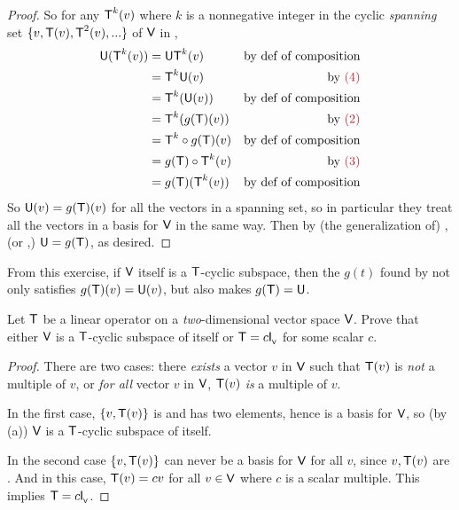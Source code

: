 \begin{proof}
So for any \(\textsf{T}^k(v)\) where \(k\) is a nonnegative integer in the cyclic \emph{spanning} set \(\{ v, \textsf{T}(v), \textsf{T}^2(v), ... \}\) of \(\textsf{V}\) in ,
\begin{align*}
    \U(\T^k(v))
    & = \U \T^k (v) & \text{by def of composition} \\
    & = \T^k \U (v) & \text{by \MAROON{(4)}} \\
    & = \T^k(\U(v)) & \text{by def of composition} \\
    & = \T^k(g(\T)(v)) & \text{by \MAROON{(2)}} \\
    & = \T^k \circ g(\T) (v) & \text{by def of composition} \\
    & = g(\T) \circ \T^k (v) & \text{by \MAROON{(3)}} \\
    & = g(\T) (\T^k(v)) & \text{by def of composition}
\end{align*}
So \(\textsf{U}(v) = g(\textsf{T})(v)\) for all the vectors in a spanning set, so in particular they treat all the vectors in a basis for \(\textsf{V}\) in the same way.
Then by (the generalization of) , (or ,) \(\textsf{U} = g(\textsf{T})\), as desired.
\end{proof}

\begin{note}
From this exercise, if \(\textsf{V}\) itself is a \(\textsf{T}\)-cyclic subspace, then the \(g(t)\) found by  not only satisfies \(g(\textsf{T})(v) = \textsf{U}(v)\), but also makes \(g(\textsf{T}) = \textsf{U}\).
\end{note}

\begin{exercise} \label{exercise 5.4.21}
Let \(\textsf{T}\) be a linear operator on a \emph{two}-dimensional vector space \(\textsf{V}\).
Prove that either \(\textsf{V}\) is a \(\textsf{T}\)-cyclic subspace of itself or \(\textsf{T} = c \textsf{I}_{_{\textsf{V}}}{}\) for some scalar \(c\).
\end{exercise}

\begin{proof}
There are two cases: there \emph{exists} a vector \(v\) in \(\textsf{V}\) such that \(\textsf{T}(v)\) is \emph{not} a multiple of \(v\),
or \emph{for all} vector \(v\) in \(\textsf{V}\), \(\textsf{T}(v)\) \emph{is} a multiple of \(v\).

In the first case, \(\{ v, \textsf{T}(v) \}\) is \LID{} and has two elements, hence is a basis for \(\textsf{V}\), so (by (a)) \(\textsf{V}\) is a \(\textsf{T}\)-cyclic subspace of itself.

In the second case \(\{ v, \textsf{T}(v) \}\) can never be a basis for \(\textsf{V}\) for all \(v\), since \(v, \textsf{T}(v)\) are \LDP{}.
And in this case, \(\textsf{T}(v) = c v\) for all \(v \in \textsf{V}\) where \(c\) is a scalar multiple.
This implies \(\textsf{T} = c \textsf{I}_{_{\textsf{V}}}{}\).
\end{proof}

